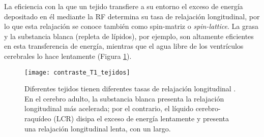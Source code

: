 La eficiencia con la que un tejido transfiere a su entorno el exceso de energía depositado en él mediante la RF determina su tasa de relajación longitudinal, por lo que esta relajación se conoce también como spin-matriz o \textit{spin-lattice}. La grasa y la substancia blanca (repleta de lípidos), por ejemplo, son altamente eficientes en esta transferencia de energía, mientras que el agua libre de los ventrículos cerebrales lo hace lentamente (Figura \ref{fig:contraste_T1_tejidos}).

\begin{figure}[htb]
\begin{figg}
   \texttt{[image: contraste\_T1\_tejidos]}
   \caption{Diferentes tejidos tienen diferentes tasas de relajación longitudinal \Tone. En el cerebro adulto, la substancia blanca presenta la relajación longitudinal más acelerada; por el contrario, el líquido cerebro-raquídeo (LCR) disipa el exceso de energía lentamente y presenta una relajación longitudinal lenta, con un \Tone largo.}
 \label{fig:contraste_T1_tejidos}
 \end{figg}
\end{figure}


